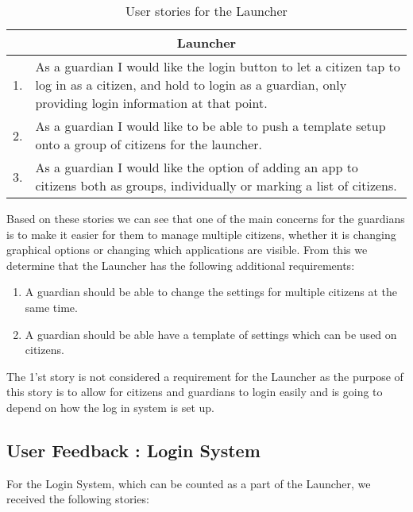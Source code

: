 \begin{table}[H]
\begin{tabular}{|c|p{12.5cm}|}
\hline 
\multicolumn{2}{|c|}{Launcher}\\ \hline 
1. & As a guardian I would like the login button to let a citizen tap to log in
as a citizen, and hold to login as a guardian, only providing login information
at that point.\\\hline
2. & As a guardian I would like to be able to push a template setup onto a group
of citizens for the launcher.\\\hline
3. & As a guardian I would like the option of adding an app to citizens both as
groups, individually or marking a list of citizens.\\\hline
\end{tabular}
\caption{User stories for the Launcher}
\label{UserStoriesLauncher}
\end{table}

Based on these stories we can see that one of the main concerns for the
guardians is to make it easier for them to manage multiple citizens, whether it
is changing graphical options or changing which applications are visible. From
this we determine that the Launcher has the following additional requirements:

\begin{enumerate}
  \item A guardian should be able to change the settings for multiple
  citizens at the same time.
  \item A guardian should be able have a template of settings which can be used
  on citizens.
\end{enumerate}
The 1'st story is not considered a requirement for the Launcher as the purpose
of this story is to allow for citizens and guardians to login easily and is
going to depend on how the log in system is set up.\nl

\subsection{User Feedback : Login System}
For the Login System, which can be counted as a part of the Launcher, we
received the following stories:

